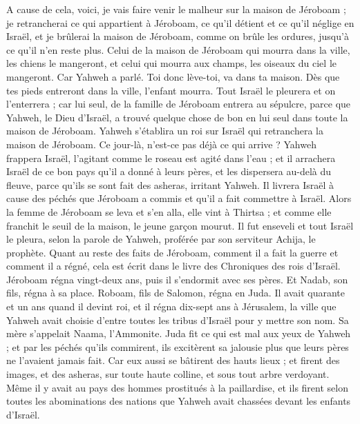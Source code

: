 \begin{multicols}{2}
A cause de cela, voici, je vais faire venir le malheur sur la maison de Jéroboam ; je retrancherai ce qui appartient à Jéroboam, ce qu'il détient et ce qu'il néglige en Israël, et je brûlerai la maison de Jéroboam, comme on brûle les ordures, jusqu'à ce qu'il n'en reste plus.
Celui de la maison de Jéroboam qui mourra dans la ville, les chiens le mangeront, et celui qui mourra aux champs, les oiseaux du ciel le mangeront. Car Yahweh a parlé.
Toi donc lève-toi, va dans ta maison. Dès que tes pieds entreront dans la ville, l'enfant mourra.
Tout Israël le pleurera et on l'enterrera ; car lui seul, de la famille de Jéroboam entrera au sépulcre, parce que Yahweh, le Dieu d'Israël, a trouvé quelque chose de bon en lui seul dans toute la maison de Jéroboam.
Yahweh s'établira un roi sur Israël qui retranchera la maison de Jéroboam. Ce jour-là, n'est-ce pas déjà ce qui arrive ?
Yahweh frappera Israël, l'agitant comme le roseau est agité dans l'eau ; et il arrachera Israël de ce bon pays qu'il a donné à leurs pères, et les dispersera au-delà du fleuve, parce qu'ils se sont fait des asheras, irritant Yahweh.
Il livrera Israël à cause des péchés que Jéroboam a commis et qu'il a fait commettre à Israël.
Alors la femme de Jéroboam se leva et s'en alla, elle vint à Thirtsa ; et comme elle franchit le seuil de la maison, le jeune garçon mourut.
Il fut enseveli et tout Israël le pleura, selon la parole de Yahweh, proférée par son serviteur Achija, le prophète.
Quant au reste des faits de Jéroboam, comment il a fait la guerre et comment il a régné, cela est écrit dans le livre des Chroniques des rois d'Israël.
Jéroboam régna vingt-deux ans, puis il s'endormit avec ses pères. Et Nadab, son fils, régna à sa place.
Roboam, fils de Salomon, régna en Juda. Il avait quarante et un ans quand il devint roi, et il régna dix-sept ans à Jérusalem, la ville que Yahweh avait choisie d'entre toutes les tribus d'Israël pour y mettre son nom. Sa mère s'appelait Naama, l'Ammonite.
Juda fit ce qui est mal aux yeux de Yahweh ; et par les péchés qu'ils commirent, ils excitèrent sa jalousie plus que leurs pères ne l'avaient jamais fait.
Car eux aussi se bâtirent des hauts lieux ; et firent des images, et des asheras, sur toute haute colline, et sous tout arbre verdoyant. 
Même il y avait au pays des hommes prostitués à la paillardise, et ils firent selon toutes les abominations des nations que Yahweh avait chassées devant les enfants d'Israël. 

\end{multicols}
